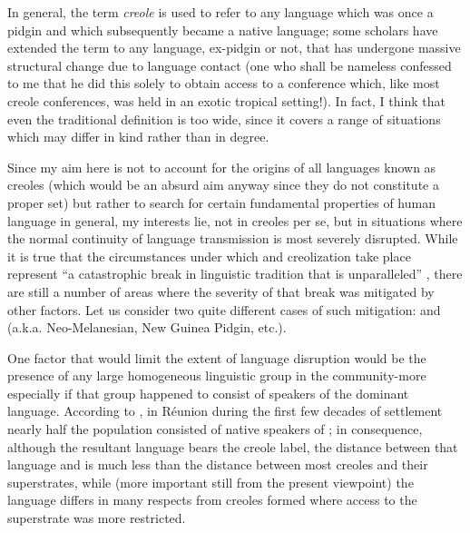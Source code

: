 In general, the term \textit{creole} is used to refer to any language which was once a pidgin and which subsequently became a native language;  some scholars have extended the term to any language, ex-pidgin or not, that has undergone massive structural change due to language contact (one who shall be nameless confessed to me that he did this solely to obtain access to a conference which, like most creole conferences, was held in an exotic tropical setting!). In fact, I think that even the traditional definition is too wide, since it covers a range of situations which may differ in kind rather than in degree.

Since my aim here is not to account for the origins of all lan\-guages known as creoles (which would be an absurd aim anyway since they do not constitute a proper set) but rather to search for certain fundamental properties of human language in general, my interests lie, not in creoles per se, but in situations where the normal continuity of language transmission is most severely disrupted. While it is true that the circumstances under which  and creolization take place represent ``a catastrophic break in linguistic tradition that is unparalleled'' \citep[24]{Sankoff1979}, there are still a number of areas where the severity of that break was mitigated by other factors. Let us consider two quite different cases of such mitigation:  and  (a.k.a. Neo-Melanesian, New Guinea Pidgin, etc.).

One factor that would limit the extent of language disruption would be the presence of any large homogeneous linguistic group in the community-more especially if that group happened to consist of speakers of the dominant language. According to \citet{Chaudenson1974}, in Réunion during the first few decades of settlement nearly half the population consisted of native speakers of ; in conse\-quence, although the resultant language bears the creole label, the distance between that language and  is much less than the distance between most creoles and their superstrates, while (more important still from the present viewpoint) the language differs in many respects from creoles formed where access to the superstrate was more restricted.

